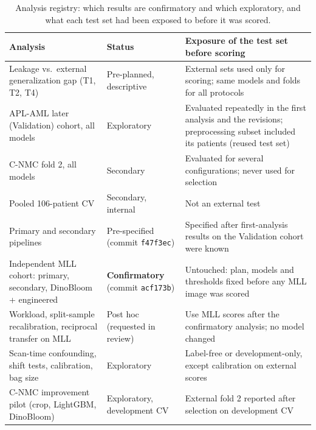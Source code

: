 \begin{table}[!htbp]
\centering
\caption{Analysis registry: which results are confirmatory and which exploratory, and what each test set had been exposed to before it was scored.}
\label{tab:registry}
\footnotesize
\setlength{\tabcolsep}{4pt}
\begin{tabular}{p{4.2cm}p{3.4cm}p{8.6cm}}
\toprule
Analysis & Status & Exposure of the test set before scoring \\
\midrule
Leakage vs.\ external generalization gap (T1, T2, T4) & Pre-planned, descriptive & External sets used only for scoring; same models and folds for all protocols \\
APL-AML later (Validation) cohort, all models & Exploratory & Evaluated repeatedly in the first analysis and the revisions; preprocessing subset included its patients (reused test set) \\
C-NMC fold 2, all models & Secondary & Evaluated for several configurations; never used for selection \\
Pooled 106-patient CV & Secondary, internal & Not an external test \\
Primary and secondary pipelines & Pre-specified (commit \texttt{f47f3ec}) & Specified after first-analysis results on the Validation cohort were known \\
Independent MLL cohort: primary, secondary, DinoBloom + engineered & \textbf{Confirmatory} (commit \texttt{acf173b}) & Untouched: plan, models and thresholds fixed before any MLL image was scored \\
Workload, split-sample recalibration, reciprocal transfer on MLL & Post hoc (requested in review) & Use MLL scores after the confirmatory analysis; no model changed \\
Scan-time confounding, shift tests, calibration, bag size & Exploratory & Label-free or development-only, except calibration on external scores \\
C-NMC improvement pilot (crop, LightGBM, DinoBloom) & Exploratory, development CV & External fold 2 reported after selection on development CV \\
\bottomrule
\end{tabular}
\end{table}
